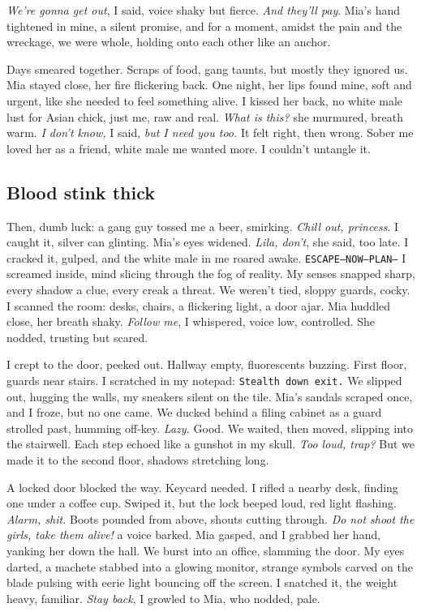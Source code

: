 \documentclass[12pt,oneside]{book}
\newcommand{\note}[1]{\texttt{#1}}
\begin{document}
\textit{We’re gonna get out}, I said, voice shaky but fierce. \textit{And they’ll pay}. Mia’s hand tightened in mine, a silent promise, and for a moment, amidst the pain and the wreckage, we were whole, holding onto each other like an anchor.

Days smeared together. Scraps of food, gang taunts, but mostly they ignored us. Mia stayed close, her fire flickering back. One night, her lips found mine, soft and urgent, like she needed to feel something alive. I kissed her back, no white male lust for Asian chick, just me, raw and real. \textit{What is this?} she murmured, breath warm. \textit{I don’t know,} I said, \textit{but I need you too.} It felt right, then wrong. Sober me loved her as a friend, white male me wanted more. I couldn’t untangle it.

\subsection*{Blood stink thick}

Then, dumb luck: a gang guy tossed me a beer, smirking. \textit{Chill out, princess}. I caught it, silver can glinting. Mia’s eyes widened. \textit{Lila, don’t}, she said, too late. I cracked it, gulped, and the white male in me roared awake. \note{ESCAPE—NOW—PLAN—} I screamed inside, mind slicing through the fog of reality. My senses snapped sharp, every shadow a clue, every creak a threat. We weren’t tied, sloppy guards, cocky. I scanned the room: desks, chairs, a flickering light, a door ajar. Mia huddled close, her breath shaky. \textit{Follow me}, I whispered, voice low, controlled. She nodded, trusting but scared.

I crept to the door, peeked out. Hallway empty, fluorescents buzzing. First floor, guards near stairs. I scratched in my notepad: \note{Stealth down exit.} We slipped out, hugging the walls, my sneakers silent on the tile. Mia’s sandals scraped once, and I froze, but no one came. We ducked behind a filing cabinet as a guard strolled past, humming off-key. \textit{Lazy.} Good. We waited, then moved, slipping into the stairwell. Each step echoed like a gunshot in my skull. \textit{Too loud, trap?} But we made it to the second floor, shadows stretching long.

A locked door blocked the way. Keycard needed. I rifled a nearby desk, finding one under a coffee cup. Swiped it, but the lock beeped loud, red light flashing. \textit{Alarm, shit.} Boots pounded from above, shouts cutting through. \textit{Do not shoot the girls, take them alive!} a voice barked. Mia gasped, and I grabbed her hand, yanking her down the hall. We burst into an office, slamming the door. My eyes darted, a machete stabbed into a glowing monitor, strange symbols carved on the blade pulsing with eerie light bouncing off the screen. I snatched it, the weight heavy, familiar. \textit{Stay back}, I growled to Mia, who nodded, pale.
\end{document}

